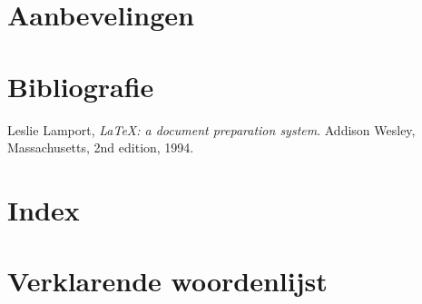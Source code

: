 \documentclass[twoside,openright,parskip]{scrreprt}
\begin{document}
\lipsum

\chapter{Aanbevelingen}

\lipsum

\chapter{Bibliografie}

\begin{thebibliography}{9999}

  Leslie Lamport,
  \emph{\LaTeX: a document preparation system}.
  Addison Wesley, Massachusetts,
  2nd edition,
  1994.

\end{thebibliography}

\chapter{Index}

\lipsum

\chapter{Verklarende woordenlijst}

\lipsum
\end{document}
